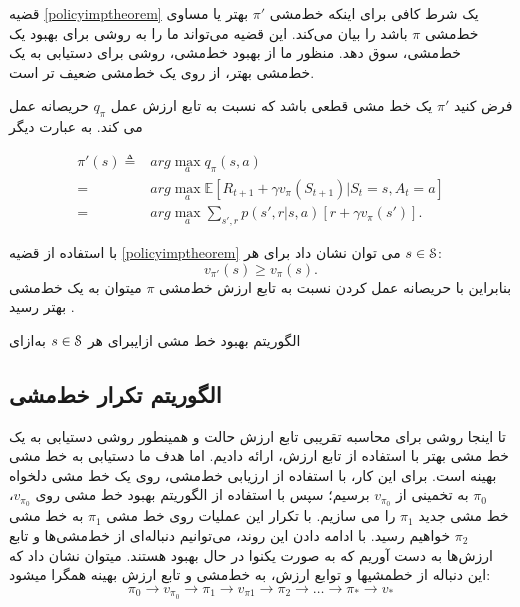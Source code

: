 قضیه \ref{policyimptheorem} یک شرط کافی برای اینکه خط‌مشی $\pi'$ بهتر یا مساوی خط‌مشی $\pi$ باشد را بیان می‌کند. این قضیه می‌تواند ما را به روشی برای بهبود یک خط‌مشی، سوق دهد. منظور ما از بهبود خط‌مشی، روشی برای دستیابی به یک خط‌مشی بهتر، از روی یک خط‌مشی ضعیف تر است.

فرض کنید $\pi'$ یک خط مشی قطعی باشد که نسبت به تابع ارزش عمل 
$q_\pi$
حریصانه عمل می کند. به عبارت دیگر

\begin{align*}
	\pi'(s) \triangleq& arg\max_{a} q_\pi(s,a) \\
	= & arg\max_{a} \mathbb{E}\left[R_{t+1} + \gamma v_\pi(S_{t+1}) | S_t = s, A_t = a\right] \\
	= & arg \max_{a} \sum_{s',r} p(s',r|s,a) \left[r + \gamma v_\pi(s')\right].\end{align*}

با استفاده از قضیه \ref{policyimptheorem} می توان نشان داد برای هر
$s \in \EuScript{S}$:
$$v_{\pi'}(s) \ge v_{\pi}(s).$$
بنابراین با حریصانه عمل کردن نسبت به تابع ارزش خط‌مشی $\pi$ می\nf توان به یک خط‌مشی بهتر رسید \cite{suttonbook}.


{الگوریتم بهبود خط مشی}
‌ازای{برای هر $s \in \EuScript{S}$}
‌به‌ازای

\subsection{الگوریتم تکرار خط‌مشی}
تا اینجا روشی برای محاسبه تقریبی تابع ارزش حالت و همینطور روشی دستیابی به یک خط مشی بهتر با استفاده از تابع ارزش، ارائه دادیم. اما هدف ما دستیابی به خط مشی بهینه است. 
برای این کار، با استفاده از ارزیابی خط‌مشی، روی یک خط مشی دلخواه $\pi_0$ به تخمینی از 
$v_{\pi_0}$
 برسیم؛ سپس با استفاده از الگوریتم بهبود خط مشی روی 
$v_{\pi_0}$،
خط مشی جدید 
$\pi_1$
را می سازیم. با تکرار این عملیات روی خط مشی 
$\pi_1$
به خط مشی 
$\pi_2$
خواهیم رسید. با ادامه دادن این روند، می‌توانیم دنباله‌ای از خط‌مشی‌ها و تابع ارزش‌ها به دست آوریم که به صورت یکنوا در حال بهبود هستند. می\nf توان نشان داد که این دنباله از خط\nf مشی\nf ها و توابع ارزش، به خط‌مشی و تابع ارزش بهینه همگرا می\nf شود:
$$\pi_0 \longrightarrow v_{\pi_0} \longrightarrow \pi_1 \longrightarrow v_{\pi{1}} \longrightarrow \pi_2 \longrightarrow \dots \longrightarrow \pi_* \longrightarrow v_*$$

